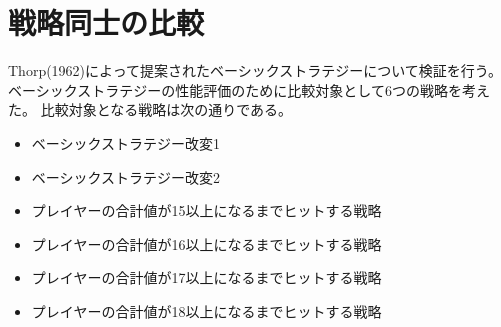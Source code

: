 





\section{戦略同士の比較}
Thorp(1962)によって提案されたベーシックストラテジーについて検証を行う。
ベーシックストラテジーの性能評価のために比較対象として6つの戦略を考えた。
比較対象となる戦略は次の通りである。

\begin{itemize}
  \item ベーシックストラテジー改変1
  \item ベーシックストラテジー改変2
  \item プレイヤーの合計値が15以上になるまでヒットする戦略
  \item プレイヤーの合計値が16以上になるまでヒットする戦略
  \item プレイヤーの合計値が17以上になるまでヒットする戦略
  \item プレイヤーの合計値が18以上になるまでヒットする戦略
\end{itemize}

